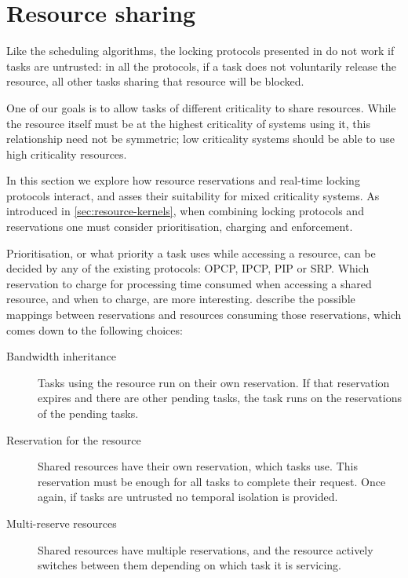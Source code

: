 \section{Resource sharing}

Like the scheduling algorithms, the locking protocols presented in
 do not work if tasks are untrusted: in all the protocols, if a
task does not voluntarily release the resource, all other tasks sharing that resource will be
blocked.

One of our goals is to allow tasks of different criticality to share resources.  While the resource
itself must be at the highest criticality of systems using it, this relationship need not be
symmetric; low criticality systems should be able to use high criticality resources.

In this section we explore how resource reservations and real-time locking protocols interact, and
asses their suitability for mixed criticality systems.  As introduced in
\cref{sec:resource-kernels}, when combining locking protocols and reservations one must consider
prioritisation, charging and enforcement.

Prioritisation, or what priority a task uses while accessing a resource, can be decided by any of
the existing protocols: \gls{OPCP}, \gls{IPCP}, \gls{PIP} or \gls{SRP}. Which reservation to charge 
for processing time consumed when accessing a shared resource, and when to charge, are more
interesting. \citet{deNiz_LSR_01} describe the possible mappings
between reservations and resources consuming those reservations, which comes down to the following
choices:

\begin{description}
\item[Bandwidth inheritance] Tasks using the resource run on their own reservation.  If that
    reservation expires and there are other pending tasks, the task runs on the reservations of the
    pending tasks. 
\item[Reservation for the resource] Shared resources have their own reservation, which tasks use.
    This reservation must be enough for all tasks to complete their request.  Once again, if tasks
    are untrusted no temporal isolation is provided. 
\item[Multi-reserve resources] Shared resources have multiple reservations, and the resource
    actively switches between them depending on which task it is servicing. 
\end{description} 

